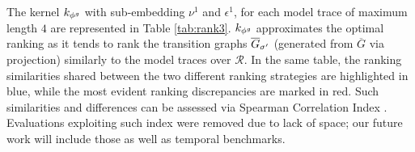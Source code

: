 {{\begin{example}%
	\vspace{0.2cm}
	The kernel $k_{{\phi^{g}}}$ with sub-embed\-ding $\nu^1$ and $\epsilon^1$, for each model trace of maximum length $4$  are represented in Table \ref{tab:rank3}. %
	$k_{{\phi^{g}}}$ approximates the optimal ranking as it tends to rank the transition graphs $\overline{G}_{\sigma'}$ (generated from $\overline{G}$ via projection) similarly to the model traces over $\mathcal{R}$. In the same table, the ranking similarities shared between the two different ranking strategies are highlighted in blue, while the most evident ranking discrepancies are marked in red. Such similarities and differences can be assessed via Spearman Correlation Index \cite{BergamiBM20}. Evaluations exploiting such index were removed due to lack of space; our future work will include those as well as temporal benchmarks.
\vspace{0cm}
\end{example}


}}
